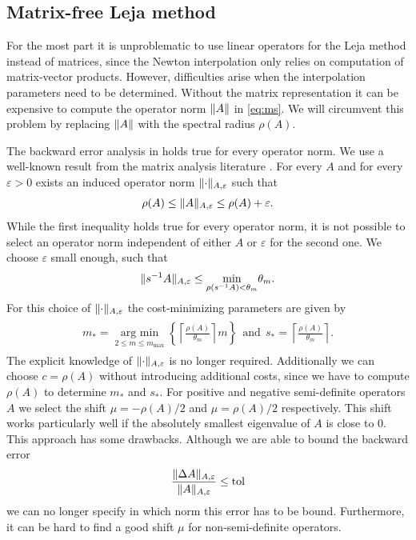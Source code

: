 \documentclass{scrartcl}
\begin{document}
	\subsection{Matrix-free Leja method} \label{sec:MatrixFreeLejaMethod}
	For the most part it is unproblematic to use linear operators for the Leja method instead of matrices, since the Newton interpolation only relies on computation of matrix-vector products. However, difficulties arise when the interpolation parameters need to be determined. Without the matrix representation it can be expensive to compute the operator norm $\lVert A\rVert$ in \eqref{eq:ms}. We will circumvent this problem by replacing $\lVert A\rVert$ with the spectral radius $\rho(A)$. 
	
	The backward error analysis in \cite{lejarev} holds true for every operator norm.
	We use a well-known result from the matrix analysis literature \cite[Lemma 5.6.10.]{matrixanalysis}. For every $A$ and for every $\varepsilon>0$ exists an induced operator norm $\lVert\cdot\rVert_{A,\varepsilon}$ such that
	\[
	\rho(A) \le \lVert A\rVert_{A,\varepsilon} \le \rho(A) + \varepsilon. 
	\]
	While the first inequality holds true for every operator norm, it is not possible to select an operator norm independent of either $A$ or $\varepsilon$ for the second one. We choose $\varepsilon$ small enough, such that
	\[
	\lVert s^{-1}A\rVert_{A,\varepsilon} \le \underset{\rho(s^{-1}A) < \theta_m}{\min}\theta_m.
	\]
	For this choice of $\lVert\cdot\rVert_{A,\varepsilon}$ the cost-minimizing parameters are given by
	\begin{align}
	\begin{split}
	m_* = \underset{2\le m\le m_{\operatorname{max}}}{\operatorname{arg\ min}}  \left\{{\left\lceil{\frac{\rho(A)}{\theta_m}}\right\rceil}m\right\} ~~\text{and}~~
	s_* =  \left\lceil{\frac{\rho(A)}{\theta_m}}\right\rceil.
	\end{split}\label{eq:msmatrixfree}
	\end{align}
	The explicit knowledge of $\lVert\cdot\rVert_{A,\varepsilon}$ is no longer required. Additionally we can choose $c=\rho(A)$ without introducing additional costs, since we have to compute $\rho(A)$ to determine $m_*$ and $s_*$. 
	For positive and negative semi-definite operators $A$ we select the shift $\mu = -\rho(A)/2$ and $\mu = \rho(A)/2$ respectively. This shift works particularly well if the absolutely smallest eigenvalue of $A$ is close to $0$.\\
	This approach has some drawbacks. Although we are able to bound the backward error
	\[
	\frac{\lVert\Delta A\rVert_{A,\varepsilon}}{\lVert A\rVert_{A,\varepsilon}} \le \operatorname{tol}  
	\]
	we can no longer specify in which norm this error has to be bound. Furthermore, it can be hard to find a good shift $\mu$ for non-semi-definite operators.
\end{document}
